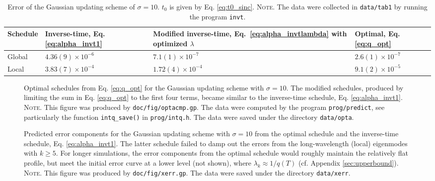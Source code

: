 \documentclass[reprint, floatfix]{revtex4-1}
\newcommand{\note}[1]{{\color{DarkGreen}\footnotesize \textsc{Note.} #1}}
\begin{document}
\begin{table}[h]
  \caption{\label{tab:error_Gaussian}
    Error of the Gaussian updating scheme of $\sigma = 10$.
    $t_0$ is given by Eq. \eqref{eq:t0_sinc}.
    \note{
      The data were collected in
      \texttt{data/tab1} by running
      the program \texttt{invt}.
    }%
  }
  \setlength{\tabcolsep}{5pt}
  \begin{tabular} { l | p{2cm} p{2.5cm} p{1.8cm} }
    \hline
      Schedule
    &
      Inverse-time, Eq. \eqref{eq:alpha_invt1}
    &
      Modified inverse-time,
      Eq.~\eqref{eq:alpha_invtlambda}
      with optimized $\lambda$
    &
      Optimal,
      Eq. \eqref{eq:q_opt}
    \\
    \hline
    Global
    &
    $4.36(9) \times 10^{-6}$
    &
    $7.1(1) \times 10^{-7}$
    &
    $2.6(1) \times 10^{-7}$
    \\
    \hline
    Local
    &
    $3.83(7) \times 10^{-4}$
    &
    $1.72(4) \times 10^{-4}$
    &
    $9.1(2) \times 10^{-5}$
    \\
    \hline
  \end{tabular}
\end{table}


\begin{figure}[h]
\begin{center}
  \caption{
    \label{fig:optacmp}
    Optimal schedules from Eq. \eqref{eq:q_opt}
    for the Gaussian updating scheme
    with $\sigma = 10$.
    The modified schedules, produced by
    limiting the sum in Eq. \eqref{eq:q_opt}
    to the first four terms,
    became similar to the inverse-time schedule,
    Eq. \eqref{eq:alpha_invt1}.
    \note{This figure was produced by \texttt{doc/fig/optacmp.gp}.
      The data were computed by the program \texttt{prog/predict},
      see particularly the function \texttt{intq\_save()}
      in \texttt{prog/intq.h}.
      The data were saved under the directory \texttt{data/opta}.
    }%
  }
\end{center}
\end{figure}


\begin{figure}[h]
\begin{center}
  \caption{
    \label{fig:xerr}
    Predicted error components for the Gaussian updating scheme
    with $\sigma = 10$
    from the optimal schedule
    and the inverse-time schedule, Eq. \eqref{eq:alpha_invt1}.
    The latter schedule failed to damp out the errors
    from the long-wavelength (local) eigenmodes
    with $k \ge 5$.
    For longer simulations,
    the error components from the optimal schedule
    would roughly maintain the relatively flat profile,
    but meet the initial error curve
    at a lower level (not shown),
    where $\lambda_k \approx 1/q(T)$
    (cf. Appendix \ref{sec:upperbound}).
    \note{This figure was produced by \texttt{doc/fig/xerr.gp}.
      The data were saved under the directory \texttt{data/xerr}.
    }%
  }
\end{center}
\end{figure}
\end{document}
